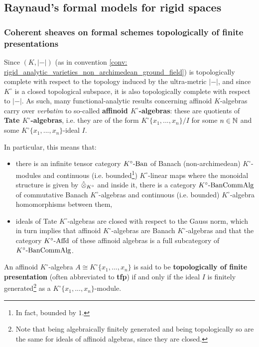     \subsection{Raynaud's formal models for rigid spaces}
        \subsubsection{Coherent sheaves on formal schemes topologically of finite presentations}
            \begin{remark} \label{remark: affinoids_over_complete_valuation_rings}
                Since $(K, |-|)$ (as in convention \ref{conv: rigid_analytic_varieties_non_archimedean_ground_field}) is topologically complete with respect to the topology induced by the ultra-metric $|-|$, and since $K^{\circ}$ is a closed topological subspace, it is also topologically complete with respect to $|-|$. As such, many functional-analytic results concerning affinoid $K$-algebras carry over \textit{verbatim} to so-called \textbf{affinoid $K^{\circ}$-algebras}: these are quotients of \textbf{Tate $K^{\circ}$-algebras}, i.e. they are of the form $K^{\circ}\{x_1, ..., x_n\}/I$ for some $n \in \mathbb{N}$ and some $K^{\circ}\{x_1, ..., x_n\}$-ideal $I$.
                
                In particular, this means that:
                    \begin{itemize}
                        \item there is an infinite tensor category $K^{\circ}\text{-}\mathrm{Ban}$ of Banach (non-archimedean) $K^{\circ}$-modules and continuous (i.e. bounded\footnote{In fact, bounded by $1$.}) $K^{\circ}$-linear maps where the monoidal structure is given by $\hattensor_{K^{\circ}}$ and inside it, there is a category $K^{\circ}\text{-}\mathrm{Ban}\mathrm{Comm}\mathrm{Alg}$ of commutative Banach $K^{\circ}$-algebras and continuous (i.e. bounded) $K^{\circ}$-algebra homomorphisms between them,
                        \item ideals of Tate $K^{\circ}$-algebras are closed with respect to the Gauss norm, which in turn implies that affinoid $K^{\circ}$-algebras are Banach $K^{\circ}$-algebras and that the category $K^{\circ}\text{-}\mathrm{Affd}$ of these affinoid algebras is a full subcategory of $K^{\circ}\text{-}\mathrm{Ban}\mathrm{Comm}\mathrm{Alg}$.
                    \end{itemize}
            \end{remark}
            \begin{definition} \label{def: affinoid_algebras_topologically_of_finite_presentation}
                An affinoid $K^{\circ}$-algebra $A \cong K^{\circ}\{x_1, ..., x_n\}$ is said to be \textbf{topologically of finite presentation} (often abbreviated to \textbf{tfp}) if and only if the ideal $I$ is finitely generated\footnote{Note that being algebraically finitely generated and being topologically so are the same for ideals of affinoid algebras, since they are closed.} as a $K^{\circ}\{x_1, ..., x_n\}$-module. 
            \end{definition}
